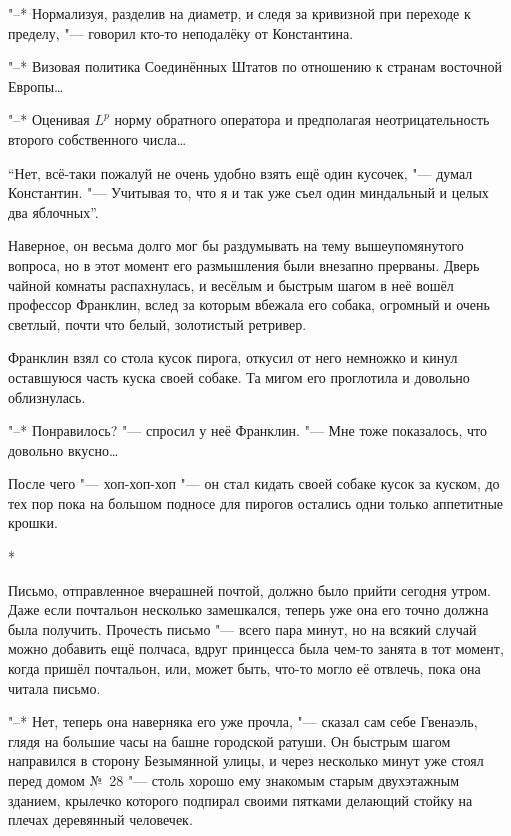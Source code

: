 "--* Нормализуя, разделив на диаметр, и следя за кривизной при переходе к
пределу, "--- говорил кто-то неподалёку от Константина.

"--* Визовая политика Соединённых Штатов по отношению к странам восточной
Европы\ldots

"--* Оценивая $L^p$ норму обратного оператора и предполагая неотрицательность
второго собственного числа\ldots

\enquote{Нет, всё-таки пожалуй не очень удобно взять ещё один кусочек, "---
думал Константин.
"--- Учитывая то, что я и так уже съел один миндальный и целых два яблочных}.

Наверное, он весьма долго мог бы раздумывать на тему вышеупомянутого вопроса, но
в этот момент его размышления были внезапно прерваны.
Дверь чайной комнаты распахнулась, и весёлым и быстрым шагом в неё вошёл
профессор Франклин, вслед за которым вбежала его собака, огромный и очень
светлый, почти что белый, золотистый ретривер.

Франклин взял со стола кусок пирога, откусил от него немножко и кинул оставшуюся
часть куска своей собаке.
Та мигом его проглотила и довольно облизнулась.

"--* Понравилось? "--- спросил у неё Франклин.
"--- Мне тоже показалось, что довольно вкусно\ldots

После чего "--- хоп-хоп-хоп "--- он стал кидать своей собаке кусок за куском,
до тех пор пока на большом подносе для пирогов остались одни только аппетитные
крошки.

\medskip
\begin{center}
*\quad*\quad*
\end{center}

\medskip
Письмо, отправленное вчерашней почтой, должно было прийти сегодня утром.
Даже если почтальон несколько замешкался, теперь уже она его точно должна была
получить.
Прочесть письмо "--- всего пара минут, но на всякий случай можно добавить ещё
полчаса, вдруг принцесса была чем-то занята в тот момент, когда пришёл
почтальон, или, может быть, что-то могло её отвлечь, пока она читала письмо.

"--* Нет, теперь она наверняка его уже прочла, "--- сказал сам себе Гвенаэль,
глядя на большие часы на башне городской ратуши.
Он быстрым шагом направился в сторону Безымянной улицы, и через несколько минут
уже стоял перед домом №~28 "--- столь хорошо ему знакомым старым двухэтажным
зданием, крылечко которого подпирал своими пятками делающий стойку на плечах
деревянный человечек.

